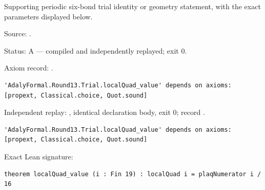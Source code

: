 \begin{theorem}[bp-425]
\label{bp-425}
\leanok
Supporting periodic six-bond trial identity or geometry statement, with the exact parameters displayed below.

\par Source: \texttt{}.
\par Status: A — compiled and independently replayed; exit 0.
\par Axiom record: \texttt{}.
\begin{verbatim}
'AdalyFormal.Round13.Trial.localQuad_value' depends on axioms: [propext, Classical.choice, Quot.sound]
\end{verbatim}
\par Independent replay: \texttt{}, identical declaration body, exit 0; record \texttt{}.
\begin{verbatim}
'AdalyFormal.Round13.Trial.localQuad_value' depends on axioms: [propext, Classical.choice, Quot.sound]
\end{verbatim}
\par Exact Lean signature:
\begin{verbatim}
theorem localQuad_value (i : Fin 19) : localQuad i = plaqNumerator i / 16
\end{verbatim}
\end{theorem}

